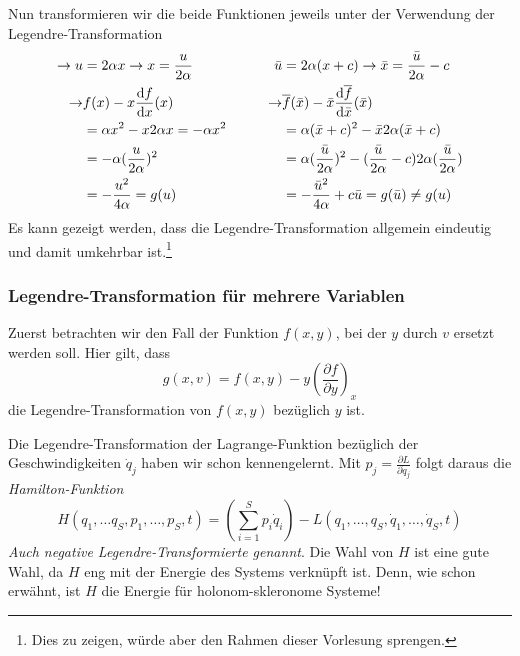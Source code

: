 \begin{beispiel*}
Nun transformieren wir die beide Funktionen jeweils unter der Verwendung der Legendre-Transformation
\begin{align*}
\rightarrow u &= 2\alpha x \rightarrow x= \frac {u}{2\alpha}      &  \qquad \bar{u} &= 2\alpha (x+c) \rightarrow \bar x= \frac {\bar{u}}{2\alpha} -c\\
\rightarrow &f(x) - x\frac{\mathrm d f}{\mathrm d x}(x)  &  \qquad   \rightarrow &\overline f(\bar x) - \bar x\frac{\mathrm d \overline f}{\mathrm d \bar x}(\bar x)\\
&= \alpha x^2 - x2\alpha x = -\alpha x^2         &    \qquad    &= \alpha (\bar x+c)^2 - \bar x 2\alpha(\bar x+c)\\
&=-\alpha(\frac{u}{2\alpha})^2      &  \qquad    &= \alpha (\frac {\bar{u}}{2\alpha})^2 - (\frac {\bar u}{2\alpha} -c) 2\alpha( \frac {\bar u}{2\alpha} )\\
&= -\frac{u^2}{4\alpha} = g(u)   &  \qquad    &= -\frac {\bar{u}^2}{4\alpha} +c\bar{u} = g(\bar{u}) \neq g(u)
\end{align*}
Es kann gezeigt werden, dass die Legendre-Transformation allgemein eindeutig und damit umkehrbar ist.\footnote{Dies zu zeigen, würde aber den Rahmen dieser Vorlesung sprengen.}
\end{beispiel*}
\subsubsection{Legendre-Transformation für mehrere Variablen}
Zuerst betrachten wir den Fall der Funktion $f(x,y)$, bei der $y$ durch $v$ ersetzt werden soll. Hier gilt, dass
\[g(x,v) = f(x,y) - y\left(\frac{\partial f}{\partial y}\right)_x\]
die Legendre-Transformation von $f(x,y)$ bezüglich $y$ ist.

Die Legendre-Transformation der Lagrange-Funktion bezüglich der Geschwindigkeiten $\dot q_j$ haben wir schon kennengelernt. Mit $p_j = \frac{\partial L}{\partial \dot q_j}$ folgt daraus die \emph{Hamilton-Funktion}
\[H(q_1,\ldots q_S,  p_1,\ldots, p_S,t) = \left(\sum\limits_{i=1}^S p_i \dot q_i\right) - L(q_1, \ldots,q_S, \dot q_1, \ldots, \dot q_S, t)\]
\textit{Auch negative Legendre-Transformierte genannt}.
Die Wahl von $H$ ist eine gute Wahl, da $H$ eng mit der Energie des Systems verknüpft ist. Denn, wie schon erwähnt, ist $H$ die Energie für holonom-skleronome Systeme!

